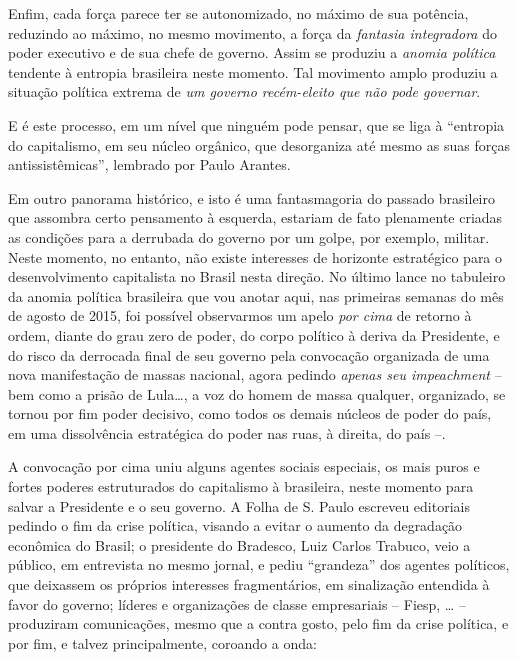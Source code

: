 Enfim, cada força parece ter se autonomizado, no máximo de sua potência,
reduzindo ao máximo, no mesmo movimento, a força da \emph{fantasia
integradora} do poder executivo e de sua chefe de governo. Assim se
produziu a \emph{anomia política} tendente à entropia brasileira neste
momento. Tal movimento amplo produziu a situação política extrema de
\emph{um governo recém-eleito que não pode governar}.

E é este processo, em um nível que ninguém pode pensar, que se liga à
``entropia do capitalismo, em seu núcleo orgânico, que desorganiza até
mesmo as suas forças antissistêmicas'', lembrado por Paulo Arantes.

Em outro panorama histórico, e isto é uma fantasmagoria do passado
brasileiro que assombra certo pensamento à esquerda, estariam de fato
plenamente criadas as condições para a derrubada do governo por um
golpe, por exemplo, militar. Neste momento, no entanto, não existe
interesses de horizonte estratégico para o desenvolvimento capitalista
no Brasil nesta direção. No último lance no tabuleiro da anomia política
brasileira que vou anotar aqui, nas primeiras semanas do mês de agosto
de 2015, foi possível observarmos um apelo \emph{por cima} de retorno à
ordem, diante do grau zero de poder, do corpo político à deriva da
Presidente, e do risco da derrocada final de seu governo pela convocação
organizada de uma nova manifestação de massas nacional, agora pedindo
\emph{apenas seu impeachment} -- bem como a prisão de Lula…, a voz do
homem de massa qualquer, organizado, se tornou por fim poder decisivo,
como todos os demais núcleos de poder do país, em uma dissolvência
estratégica do poder nas ruas, à direita, do país --.

A convocação por cima uniu alguns agentes sociais especiais, os mais
puros e fortes poderes estruturados do capitalismo à brasileira, neste
momento para salvar a Presidente e o seu governo. A Folha de S. Paulo
escreveu editoriais pedindo o fim da crise política, visando a evitar o
aumento da degradação econômica do Brasil; o presidente do Bradesco,
Luiz Carlos Trabuco, veio a público, em entrevista no mesmo jornal, e
pediu ``grandeza'' dos agentes políticos, que deixassem os próprios
interesses fragmentários, em sinalização entendida à favor do governo;
líderes e organizações de classe empresariais -- Fiesp, … --
produziram comunicações, mesmo que a contra gosto, pelo fim da crise
política, e por fim, e talvez principalmente, coroando a onda:

